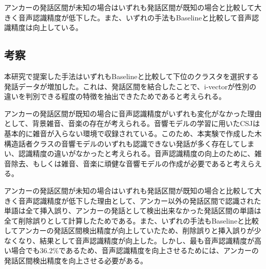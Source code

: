 アンカーの発話区間が未知の場合はいずれも発話区間が既知の場合と比較して大きく音声認識精度が低下した。また、いずれの手法もBaselineと比較して音声認識精度は向上している。

\subsection{考察}
本研究で提案した手法はいずれもBaselineと比較して下位のクラスタを選択する発話データが増加した。これは、発話区間を結合したことで、i-vectorが性別の違いを判別できる程度の特徴を抽出できたためであると考えられる。\par
アンカーの発話区間が既知の場合に音声認識精度がいずれも変化がなかった理由として、背景雑音、音楽の存在が考えられる。音響モデルの学習に用いたCSJは基本的に雑音が入らない環境で収録されている。このため、本実験で作成した木構造話者クラスの音響モデルのいずれも認識できない発話が多く存在してしまい、認識精度の違いがなかったと考えられる。音声認識精度の向上のために、雑音除去、もしくは雑音、音楽に頑健な音響モデルの作成が必要であると考えらえる。\par
アンカーの発話区間が未知の場合はいずれも発話区間が既知の場合と比較して大きく音声認識精度が低下した理由として、アンカー以外の発話区間で認識された単語は全て挿入誤り、アンカーの発話として検出出来なかった発話区間の単語は全て削除誤りとして計算したためである。また、いずれの手法もBaselineと比較してアンカーの発話区間検出精度が向上していたため、削除誤りと挿入誤りが少なくなり、結果として音声認識精度が向上した。しかし、最も音声認識精度が高い場合でも36.2\%であるため、音声認識精度を向上させるためには、アンカーの発話区間検出精度を向上させる必要がある。
